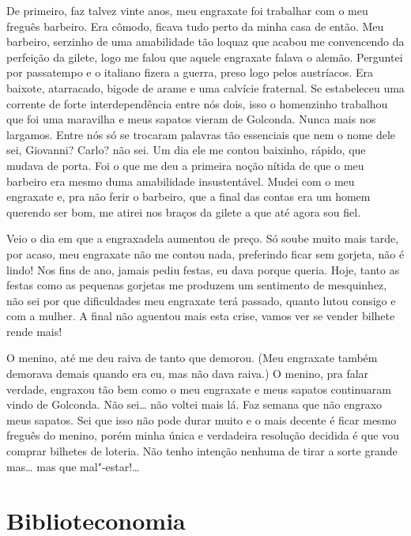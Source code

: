 De primeiro, faz talvez vinte anos, meu engraxate foi trabalhar com o
meu freguês barbeiro. Era cômodo, ficava tudo perto da minha casa de
então. Meu barbeiro, serzinho de uma amabilidade tão loquaz que acabou
me convencendo da perfeição da gilete, logo me falou que aquele
engraxate falava o alemão. Perguntei por passatempo e o italiano fizera
a guerra, preso logo pelos austríacos. Era baixote, atarracado, bigode
de arame e uma calvície fraternal. Se estabeleceu uma corrente de forte
interdependência entre nós dois, isso o homenzinho trabalhou que foi uma
maravilha e meus sapatos vieram de Golconda. Nunca mais nos largamos.
Entre nós só se trocaram palavras tão essenciais que nem o nome dele
sei, Giovanni? Carlo? não sei. Um dia ele me contou baixinho, rápido,
que mudava de porta. Foi o que me deu a primeira noção nítida de que o
meu barbeiro era mesmo duma amabilidade insustentável. Mudei com o meu
engraxate e, pra não ferir o barbeiro, que a final das contas era um
homem querendo ser bom, me atirei nos braços da gilete a que até agora
sou fiel.

Veio o dia em que a engraxadela aumentou de preço. Só soube muito mais
tarde, por acaso, meu engraxate não me contou nada, preferindo ficar sem
gorjeta, não é lindo! Nos fins de ano, jamais pediu festas, eu dava
porque queria. Hoje, tanto as festas como as pequenas gorjetas me
produzem um sentimento de mesquinhez, não sei por que dificuldades meu
engraxate terá passado, quanto lutou consigo e com a mulher. A final não
aguentou mais esta crise, vamos ver se vender bilhete rende mais!

O menino, até me deu raiva de tanto que demorou. (Meu engraxate também
demorava demais quando era eu, mas não dava raiva.) O menino, pra falar
verdade, engraxou tão bem como o meu engraxate e meus sapatos
continuaram vindo de Golconda. Não sei\ldots{} não voltei mais lá. Faz semana
que não engraxo meus sapatos. Sei que isso não pode durar muito e o mais
decente é ficar mesmo freguês do menino, porém minha única e verdadeira
resolução decidida é que vou comprar bilhetes de loteria. Não tenho
intenção nenhuma de tirar a sorte grande mas\ldots{} mas que mal"-estar!\ldots{}

\chapter{Biblioteconomia}


